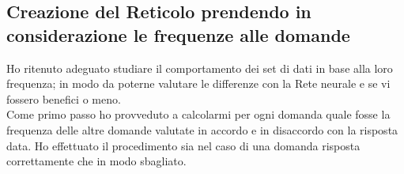 \subsection{Creazione del Reticolo prendendo in considerazione le frequenze alle domande}
\label{Creazione del Reticolo prendendo in considerazione le frequenze alle domande}
Ho ritenuto adeguato studiare il comportamento dei set di dati in base alla loro frequenza; in modo da poterne valutare le differenze con la Rete neurale e se vi fossero benefici o meno.\\
Come primo passo ho provveduto a calcolarmi per ogni domanda quale fosse la frequenza delle altre domande valutate in accordo e in disaccordo con la risposta data. Ho effettuato il procedimento sia nel caso di una domanda risposta correttamente che in modo sbagliato.


